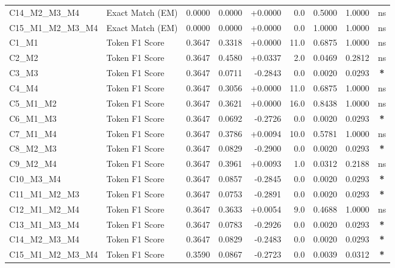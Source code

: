\begin{table}[p]
\begin{tabular*}{\textwidth}{@{\extracolsep{\fill}} l l r r r r r r c @{}}
\addlinespace
C14\_M2\_M3\_M4 & Exact Match (EM)     & 0.0000 & 0.0000 & +0.0000 & 0.0 & 0.5000 & 1.0000 & ns \\
\addlinespace
C15\_M1\_M2\_M3\_M4 & Exact Match (EM)     & 0.0000 & 0.0000 & +0.0000 & 0.0 & 1.0000 & 1.0000 & ns \\
\addlinespace
C1\_M1          & Token F1 Score       & 0.3647 & 0.3318 & +0.0000 & 11.0 & 0.6875 & 1.0000 & ns \\
\addlinespace
C2\_M2          & Token F1 Score       & 0.3647 & 0.4580 & +0.0337 & 2.0 & 0.0469 & 0.2812 & ns \\
\addlinespace
C3\_M3          & Token F1 Score       & 0.3647 & 0.0711 & -0.2843 & 0.0 & 0.0020 & 0.0293 & \textbf{*} \\
\addlinespace
C4\_M4          & Token F1 Score       & 0.3647 & 0.3056 & +0.0000 & 11.0 & 0.6875 & 1.0000 & ns \\
\addlinespace
C5\_M1\_M2      & Token F1 Score       & 0.3647 & 0.3621 & +0.0000 & 16.0 & 0.8438 & 1.0000 & ns \\
\addlinespace
C6\_M1\_M3      & Token F1 Score       & 0.3647 & 0.0692 & -0.2726 & 0.0 & 0.0020 & 0.0293 & \textbf{*} \\
\addlinespace
C7\_M1\_M4      & Token F1 Score       & 0.3647 & 0.3786 & +0.0094 & 10.0 & 0.5781 & 1.0000 & ns \\
\addlinespace
C8\_M2\_M3      & Token F1 Score       & 0.3647 & 0.0829 & -0.2900 & 0.0 & 0.0020 & 0.0293 & \textbf{*} \\
\addlinespace
C9\_M2\_M4      & Token F1 Score       & 0.3647 & 0.3961 & +0.0093 & 1.0 & 0.0312 & 0.2188 & ns \\
\addlinespace
C10\_M3\_M4     & Token F1 Score       & 0.3647 & 0.0857 & -0.2845 & 0.0 & 0.0020 & 0.0293 & \textbf{*} \\
\addlinespace
C11\_M1\_M2\_M3 & Token F1 Score       & 0.3647 & 0.0753 & -0.2891 & 0.0 & 0.0020 & 0.0293 & \textbf{*} \\
\addlinespace
C12\_M1\_M2\_M4 & Token F1 Score       & 0.3647 & 0.3633 & +0.0054 & 9.0 & 0.4688 & 1.0000 & ns \\
\addlinespace
C13\_M1\_M3\_M4 & Token F1 Score       & 0.3647 & 0.0783 & -0.2926 & 0.0 & 0.0020 & 0.0293 & \textbf{*} \\
\addlinespace
C14\_M2\_M3\_M4 & Token F1 Score       & 0.3647 & 0.0829 & -0.2483 & 0.0 & 0.0020 & 0.0293 & \textbf{*} \\
\addlinespace
C15\_M1\_M2\_M3\_M4 & Token F1 Score       & 0.3590 & 0.0867 & -0.2723 & 0.0 & 0.0039 & 0.0312 & \textbf{*} \\

\end{tabular*}
\end{table}

